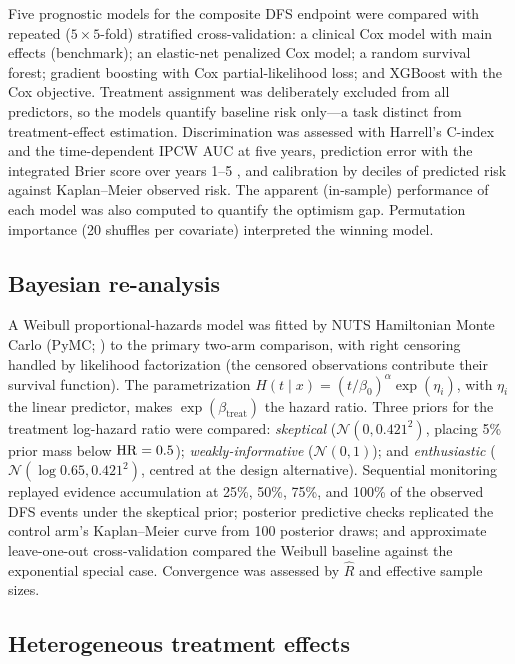 Five prognostic models for the composite DFS endpoint were compared with
repeated ($5\times5$-fold) stratified cross-validation: a clinical Cox
model with main effects (benchmark); an elastic-net penalized Cox model;
a random survival forest; gradient boosting with Cox partial-likelihood
loss; and XGBoost with the Cox objective. Treatment assignment was
deliberately excluded from all predictors, so the models quantify
baseline risk only---a task distinct from treatment-effect estimation.
Discrimination was assessed with Harrell's C-index and the time-dependent
IPCW AUC at five years, prediction error with the integrated Brier score
over years 1--5 \citep{graf1999}, and calibration by deciles of
predicted risk against Kaplan--Meier observed risk. The apparent
(in-sample) performance of each model was also computed to quantify the
optimism gap. Permutation importance (20 shuffles per covariate)
interpreted the winning model.

\subsection{Bayesian re-analysis}\label{sec:methods-bayes}

A Weibull proportional-hazards model was fitted by NUTS Hamiltonian
Monte Carlo (PyMC; \citealp{salvatier2016}) to the primary two-arm
comparison, with right censoring handled by likelihood factorization
(the censored observations contribute their survival function). The
parametrization $H(t \mid x) = (t/\beta_0)^\alpha \exp(\eta_i)$, with
$\eta_i$ the linear predictor, makes $\exp(\beta_{\mathrm{treat}})$ the
hazard ratio. Three priors for the treatment log-hazard ratio were
compared: \emph{skeptical} ($\mathcal{N}(0, 0.421^2)$, placing 5\% prior
mass below $\mathrm{HR} = 0.5$); \emph{weakly-informative}
($\mathcal{N}(0, 1)$); and \emph{enthusiastic}
($\mathcal{N}(\log 0.65, 0.421^2)$, centred at the design alternative).
Sequential monitoring replayed evidence accumulation at 25\%, 50\%, 75\%,
and 100\% of the observed DFS events under the skeptical prior; posterior
predictive checks replicated the control arm's Kaplan--Meier curve from
100 posterior draws; and approximate leave-one-out cross-validation
\citep{vehtari2017} compared the Weibull baseline against the
exponential special case. Convergence was assessed by $\hat R$ and
effective sample sizes.

\subsection{Heterogeneous treatment effects}\label{sec:methods-cate}

